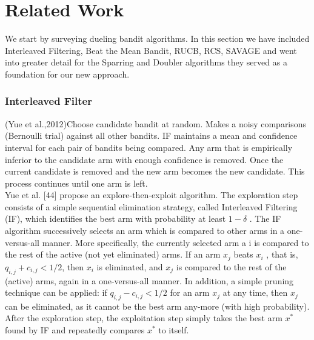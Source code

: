 \documentclass{llncs}
\begin{document}
\newpage

\section{Related Work}
	We start by surveying dueling bandit algorithms. In this section we have included Interleaved Filtering, Beat the Mean Bandit, RUCB, RCS, SAVAGE and went into greater detail for the Sparring and Doubler algorithms they served as a foundation for our new approach.
	
\subsubsection{Interleaved Filter}
	(Yue et al.,2012)Choose candidate bandit at random. Makes a noisy comparisons (Bernoulli trial) against all other bandits. 
	IF maintains a mean and confidence interval for each pair of bandits being compared. Any arm that is empirically inferior to the candidate arm with  enough confidence is removed.
	Once the current candidate is removed and the new arm becomes the new candidate. This process continues until one arm is left.
\\
Yue et al. [44] propose an explore-then-exploit algorithm. 
The exploration step consists of a simple sequential elimination strategy,
called Interleaved Filtering (IF), which identifies the best arm with probability at least $1-\delta $ . The IF algorithm successively selects an arm which is compared to other arms in a one-versus-all manner. More specifically, the currently selected arm a i is compared to the rest of the active (not yet eliminated) arms. 
If an arm $x_j$ beats $x_i$ , that is, $q_{i,j}+c_{i,j}<1/2$, then $x_i$ is eliminated, and $x_j$ is compared to the rest of the (active) arms, again in a one-versus-all manner.
In addition, a simple pruning technique can be applied: if $q_{i,j}-c_{i,j}<1/2$ for
an arm $x_j$ at any time, then $x_j$ can be eliminated, as it cannot be the best arm any-more (with high probability). After the exploration step, the exploitation step simply takes the best arm $x^*$ found by IF and repeatedly compares $x^*$ to itself.	
	
	

\newpage
\end{document}

